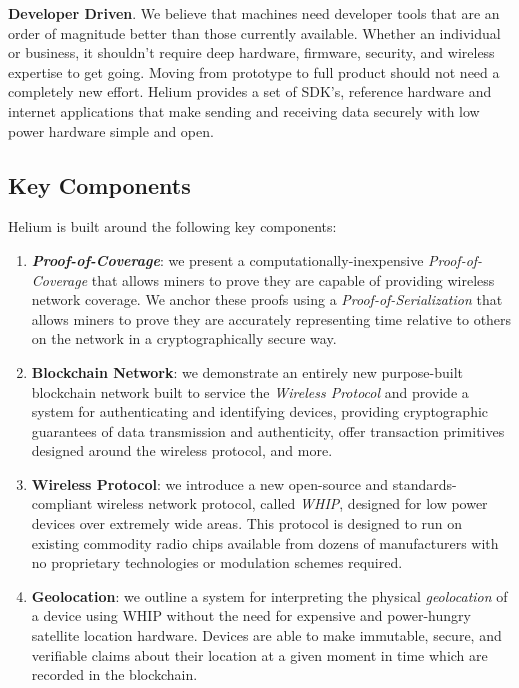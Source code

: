 \documentclass[10pt, nonatbib, nocopyrightspace, reprint]{sigplanconf}
\begin{document}
\textbf{Developer Driven}. We believe that machines need developer tools that are an order of magnitude better than those currently available. Whether an individual or business, it shouldn't require deep hardware, firmware, security, and wireless expertise to get going. Moving from prototype to full product should not need a completely new effort. Helium provides a set of SDK's, reference hardware and internet applications that make sending and receiving data securely with low power hardware simple and open.

\subsection{Key Components}

Helium is built around the following key components:

\begin{enumerate}
  \item \textbf{\emph{Proof-of-Coverage}}: we present a computationally-inexpensive \emph{Proof-of-Coverage} that allows miners to prove they are capable of providing wireless network coverage. We anchor these proofs using a \emph{Proof-of-Serialization} that allows miners to prove they are accurately representing time relative to others on the network in a cryptographically secure way.

  \item \textbf{Blockchain Network}: we demonstrate an entirely new purpose-built blockchain network built to service the \emph{Wireless Protocol} and provide a system for authenticating and identifying devices, providing cryptographic guarantees of data transmission and authenticity, offer transaction primitives designed around the wireless protocol, and more.

    \item \textbf{Wireless Protocol}: we introduce a new open-source and standards-compliant wireless network protocol, called \emph{WHIP}, designed for low power devices over extremely wide areas. This protocol is designed to run on existing commodity radio chips available from dozens of manufacturers with no proprietary technologies or modulation schemes required.

    \item \textbf{Geolocation}: we outline a system for interpreting the physical \emph{geolocation} of a device using WHIP without the need for expensive and power-hungry satellite location hardware. Devices are able to make immutable, secure, and verifiable claims about their location at a given moment in time which are recorded in the blockchain.
\end{enumerate}
\end{document}
